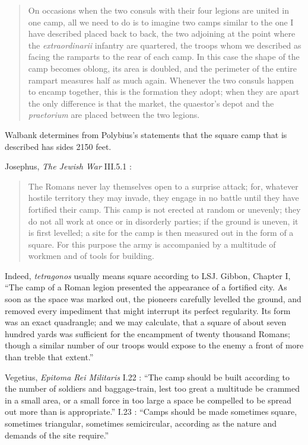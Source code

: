 \documentclass{article}
\theoremstyle{definition}
\begin{document}
\begin{quote}
On occasions when the two consuls with their four legions are united in one camp, all we need to do is to imagine two camps similar to the one I have described placed
back to back, the two adjoining at the point where the {\em extraordinarii} infantry are quartered, the troops whom we described as facing the ramparts to the rear of each
camp. In this case the shape of the camp becomes oblong, its area is doubled, and the perimeter of the entire rampart measures half as much again. Whenever the two
consuls happen to encamp together, this is the formation they adopt; when they are apart the only difference is that the market, the quaestor's depot and the {\em praetorium}
are placed between the two legions.
\end{quote}

Walbank \cite[p.~715]{walbankII} determines from Polybius's statements that 
the square camp that is described has sides 2150 feet. 

Josephus, {\em The Jewish War} III.5.1 \cite[p.~599]{josephus}: 

\begin{quote}
The Romans never lay themselves open to a surprise attack; for, whatever hostile territory they may invade, they engage in no battle until they have fortified their camp.
This camp is not erected at random or unevenly; they do not all work at once or in disorderly parties; if the ground is uneven, it is first levelled; 
a site for the camp is then measured out in the form of a square. For this purpose the army is accompanied by a multitude of workmen and of tools for building.
\end{quote}

Indeed, {\em tetragonos} usually means square according to LSJ. Gibbon, Chapter I, ``The camp of a Roman legion
presented the appearance of a fortified city. As soon as the space was marked out, the pioneers carefully levelled
the ground, and removed every impediment that might interrupt its perfect regularity.
Its form was an exact quadrangle; and we may
calculate, that a square of about seven hundred yards was sufficient for the encampment of twenty thousand Romans; though a similar number
of our troops would expose to the enemy a front of more than treble that extent.''

Vegetius, {\em Epitoma Rei Militaris} 
I.22 \cite[p.~24]{vegetius}: ``The camp should be built according to the number of soldiers and baggage-train, lest too great
a multitude be crammed in a small area, or a small force in too large a space be compelled to be spread
out more than is appropriate.''
I.23 \cite[p.~24]{vegetius}: ``Camps should be made sometimes square, sometimes triangular,
sometimes semicircular, according as the nature and demands of the site require.''
\end{document}
